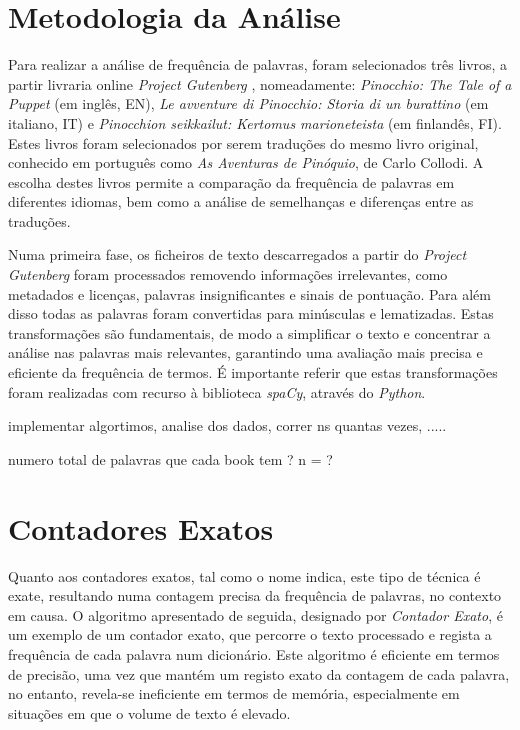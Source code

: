 \documentclass[mirror, portugues]{revdetua}
\begin{document}
\section{Metodologia da Análise}

Para realizar a análise de frequência de palavras, foram selecionados três livros, a partir livraria online \textit{Project Gutenberg} \cite{PG24}, nomeadamente: \textit{Pinocchio: The Tale of a Puppet} (em inglês, EN), \textit{Le avventure di Pinocchio: Storia di un burattino} (em italiano, IT) e \textit{Pinocchion seikkailut: Kertomus marioneteista} (em finlandês, FI). Estes livros foram selecionados por serem traduções do mesmo livro original, conhecido em português como \textit{As Aventuras de Pinóquio}, de Carlo Collodi. A escolha destes livros permite a comparação da frequência de palavras em diferentes idiomas, bem como a análise de semelhanças e diferenças entre as traduções.

Numa primeira fase, os ficheiros de texto descarregados a partir do \textit{Project Gutenberg} foram processados removendo informações irrelevantes, como metadados e licenças, palavras insignificantes e sinais de pontuação. Para além disso todas as palavras foram convertidas para minúsculas e lematizadas. Estas transformações são fundamentais, de modo a simplificar o texto e concentrar a análise nas palavras mais relevantes, garantindo uma avaliação mais precisa e eficiente da frequência de termos. É importante referir que estas transformações foram realizadas com recurso à biblioteca \textit{spaCy}, através do \textit{Python}.


implementar algortimos, analise dos dados, correr ns quantas vezes, .....

numero total de palavras que cada book tem ? n = ?


\section{Contadores Exatos}

Quanto aos contadores exatos, tal como o nome indica, este tipo de técnica é exate, resultando numa contagem precisa da frequência de palavras, no contexto em causa.
O algoritmo apresentado de seguida, designado por \textit{Contador Exato}, é um exemplo de um contador exato, que percorre o texto processado e regista a frequência de cada palavra num dicionário. Este algoritmo é eficiente em termos de precisão, uma vez que mantém um registo exato da contagem de cada palavra, no entanto, revela-se ineficiente em termos de memória, especialmente em situações em que o volume de texto é elevado.
\end{document}
